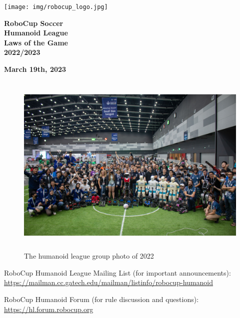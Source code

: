 \documentclass[a4paper]{article}
\title{}
\author{\rulesauthor}
\date{2022-06-11}
\begin{document}
    \sffamily

    \begin{center}
        \texttt{[image: img/robocup\_logo.jpg]}

        {\Huge \bfseries
        RoboCup Soccer
        \\
        Humanoid League
        \\
        Laws of the Game
        \\ \vspace{0.5cm}
        2022/2023}

        \bigskip

        {\bfseries March 19th, 2023}
    \end{center}

    \begin{figure}[!h]
        \centering
        \includegraphics[height=3.5in]{img/cover_2023.jpeg}
        \captionsetup{labelformat=empty}
\caption{The humanoid league group photo of 2022}
    \end{figure}


    \bigskip
    RoboCup Humanoid League Mailing List (for important announcements):\\
    \url{https://mailman.cc.gatech.edu/mailman/listinfo/robocup-humanoid}

    \medskip
    RoboCup Humanoid Forum (for rule discussion and questions):\\
    \url{https://hl.forum.robocup.org}
\end{document}
